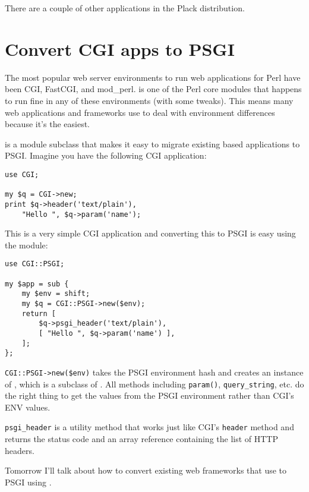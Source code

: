 There are a couple of other  applications in the Plack
distribution.

\chapter{Convert CGI apps to
PSGI}\label{day-6-convert-cgi-apps-to-psgi}

The most popular web server environments to run web applications for
Perl have been CGI, FastCGI, and mod\_perl.  is one of the Perl
core modules that happens to run fine in any of these environments (with
some tweaks). This means many web applications and frameworks use 
to deal with environment differences because it's the easiest.

\href{http://search.cpan.org/perldoc?CGI::PSGI}{} is a 
module subclass that makes it easy to migrate existing  based
applications to PSGI. Imagine you have the following CGI application:

\begin{lstlisting}
use CGI;

my $q = CGI->new;
print $q->header('text/plain'),
    "Hello ", $q->param('name');
\end{lstlisting}

This is a very simple CGI application and converting this to PSGI is
easy using the  module:

\begin{lstlisting}
use CGI::PSGI;

my $app = sub {
    my $env = shift;
    my $q = CGI::PSGI->new($env);
    return [
        $q->psgi_header('text/plain'),
        [ "Hello ", $q->param('name') ],
    ];
};
\end{lstlisting}

\lstinline!CGI::PSGI->new($env)! takes the PSGI environment hash and
creates an instance of , which is a subclass of . All
methods including \lstinline!param()!, \lstinline!query_string!, etc. do
the right thing to get the values from the PSGI environment rather than
CGI's ENV values.

\lstinline!psgi_header! is a utility method that works just like CGI's
\lstinline!header! method and returns the status code and an array
reference containing the list of HTTP headers.

Tomorrow I'll talk about how to convert existing web frameworks that use
 to PSGI using .

